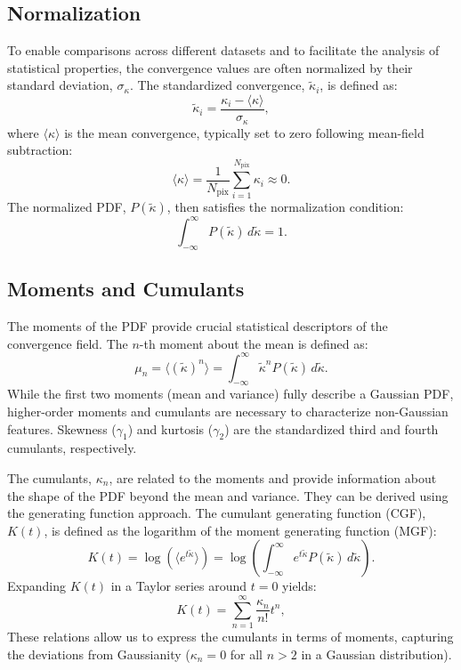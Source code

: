 \subsection{Normalization}
To enable comparisons across different datasets and to facilitate the analysis of statistical properties, the convergence values are often normalized by their standard deviation, $\sigma_\kappa$. The standardized convergence, $\tilde{\kappa}_i$, is defined as:
\begin{equation}
    \tilde{\kappa}_i = \frac{\kappa_i - \langle \kappa \rangle}{\sigma_\kappa},
    \label{eq:kappa_normalized}
\end{equation}
where $\langle \kappa \rangle$ is the mean convergence, typically set to zero following mean-field subtraction:
\begin{equation}
    \langle \kappa \rangle = \frac{1}{N_{\mathrm{pix}}} \sum_{i=1}^{N_{\mathrm{pix}}} \kappa_i \approx 0.
\end{equation}
The normalized PDF, $P(\tilde{\kappa})$, then satisfies the normalization condition:
\begin{equation}
    \int_{-\infty}^{\infty} P(\tilde{\kappa}) \, d\tilde{\kappa} = 1.
    \label{eq:pdf_normalization}
\end{equation}

\subsection{Moments and Cumulants}
The moments of the PDF provide crucial statistical descriptors of the convergence field. The $n$-th moment about the mean is defined as:
\begin{equation}
    \mu_n = \langle (\tilde{\kappa})^n \rangle = \int_{-\infty}^{\infty} \tilde{\kappa}^n P(\tilde{\kappa}) \, d\tilde{\kappa}.
    \label{eq:moments}
\end{equation}
While the first two moments (mean and variance) fully describe a Gaussian PDF, higher-order moments and cumulants are necessary to characterize non-Gaussian features. Skewness ($\gamma_1$) and kurtosis ($\gamma_2$) are the standardized third and fourth cumulants, respectively.

The cumulants, $\kappa_n$, are related to the moments and provide information about the shape of the PDF beyond the mean and variance. They can be derived using the generating function approach. The cumulant generating function (CGF), $K(t)$, is defined as the logarithm of the moment generating function (MGF):
\begin{equation}
    K(t) = \log \left( \langle e^{t \tilde{\kappa}} \rangle \right) = \log \left( \int_{-\infty}^{\infty} e^{t \tilde{\kappa}} P(\tilde{\kappa}) \, d\tilde{\kappa} \right).
\end{equation}
Expanding $K(t)$ in a Taylor series around $t=0$ yields:
\begin{equation}
    K(t) = \sum_{n=1}^{\infty} \frac{\kappa_n}{n!} t^n,
\end{equation}
These relations allow us to express the cumulants in terms of moments, capturing the deviations from Gaussianity ($\kappa_n = 0$ for all $n > 2$ in a Gaussian distribution).